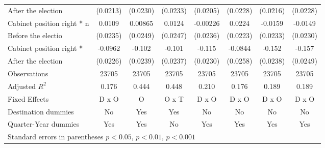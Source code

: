 \begin{table}[htbp]
\begin{tabular}{l*{7}{c}}
After the election                    &    (0.0213)         &    (0.0230)         &    (0.0233)         &    (0.0205)         &    (0.0228)         &    (0.0216)         &    (0.0228)         \\
[0.5em]
Cabinet position right * n&      0.0109         &     0.00865         &      0.0124         &    -0.00226         &      0.0224         &     -0.0159         &     -0.0149         \\
Before the electio                    &    (0.0235)         &    (0.0249)         &    (0.0247)         &    (0.0236)         &    (0.0223)         &    (0.0233)         &    (0.0230)         \\
[0.5em]
Cabinet position right * &     -0.0962\sym{***}&      -0.102\sym{***}&      -0.101\sym{***}&      -0.115\sym{***}&     -0.0844\sym{**} &      -0.152\sym{***}&      -0.157\sym{***}\\
After the election                    &    (0.0226)         &    (0.0239)         &    (0.0237)         &    (0.0230)         &    (0.0258)         &    (0.0238)         &    (0.0249)         \\
\hline
Observations        &       23705         &       23705         &       23705         &       23705         &       23705         &       23705         &       23705         \\
Adjusted \(R^{2}\)  &       0.176         &       0.444         &       0.448         &       0.210         &       0.176         &       0.189         &       0.189         \\
Fixed Effects       &       D x O         &           O         &       O x T         &       D x O         &       D x O         &       D x O         &       D x O         \\
Destination dummies &          No         &         Yes         &         Yes         &          No         &          No         &          No         &          No         \\
Quarter-Year dummies&         Yes         &         Yes         &          No         &         Yes         &         Yes         &         Yes         &         Yes         \\
\hline\hline
\multicolumn{8}{l}{ Standard errors in parentheses \sym{*} \(p<0.05\), \sym{**} \(p<0.01\), \sym{***} \(p<0.001\)}\\
\end{tabular}
\label{app_table_base-R6}
\end{table}
